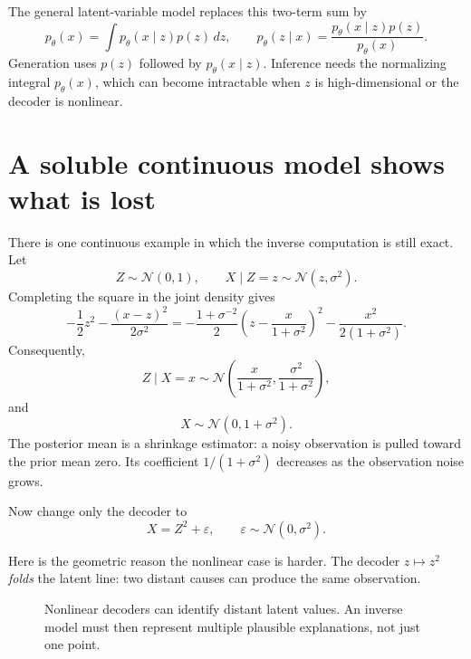 The general latent-variable model replaces this two-term sum by
\[
 p_\theta(x)=\int p_\theta(x\mid z)p(z)\,dz,\qquad
 p_\theta(z\mid x)=\frac{p_\theta(x\mid z)p(z)}{p_\theta(x)}.
\]
Generation uses \(p(z)\) followed by \(p_\theta(x\mid z)\). Inference needs the normalizing integral \(p_\theta(x)\), which can become intractable when \(z\) is high-dimensional or the decoder is nonlinear.

\section{A soluble continuous model shows what is lost}

There is one continuous example in which the inverse computation is still exact. Let
\[
 Z\sim\mathcal N(0,1),\qquad
 X\mid Z=z\sim\mathcal N(z,\sigma^2).
\]
Completing the square in the joint density gives
\[
 -\frac12z^2-\frac{(x-z)^2}{2\sigma^2}
 =-\frac{1+\sigma^{-2}}2
   \left(z-\frac{x}{1+\sigma^2}\right)^2
   -\frac{x^2}{2(1+\sigma^2)}.
\]
Consequently,
\[
 \boxed{Z\mid X=x\sim
 \mathcal N\left(\frac{x}{1+\sigma^2},
                \frac{\sigma^2}{1+\sigma^2}\right),}
\]
and
\[
 X\sim\mathcal N(0,1+\sigma^2).
\]
The posterior mean is a shrinkage estimator: a noisy observation is pulled toward the prior mean zero. Its coefficient \(1/(1+\sigma^2)\) decreases as the observation noise grows.

Now change only the decoder to
\[
 X=Z^2+\varepsilon,\qquad
 \varepsilon\sim\mathcal N(0,\sigma^2).
\]

Here is the geometric reason the nonlinear case is harder. The decoder \(z\mapsto z^2\) \emph{folds} the latent line: two distant causes can produce the same observation.

\begin{figure}[H]
\centering
{}
\caption{Nonlinear decoders can identify distant latent values. An inverse model must then represent multiple plausible explanations, not just one point.}
\end{figure}


